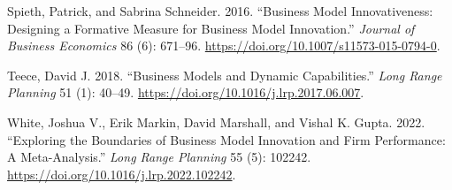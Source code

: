 \documentclass[
]{article}
\newlength{\cslhangindent}
\newenvironment{CSLReferences}[2] %
 {\begin{list}{}{%
  \setlength{\itemindent}{0pt}
  \setlength{\leftmargin}{0pt}
  \setlength{\parsep}{0pt}
  \ifodd #1
   \setlength{\leftmargin}{\cslhangindent}
   \setlength{\itemindent}{-1\cslhangindent}
  \fi
  \setlength{\itemsep}{#2\baselineskip}}}
 {\end{list}}
\begin{document}
\begin{CSLReferences}{1}{0}
Spieth, Patrick, and Sabrina Schneider. 2016. {``Business Model
Innovativeness: Designing a Formative Measure for Business Model
Innovation.''} \emph{Journal of Business Economics} 86 (6): 671--96.
\url{https://doi.org/10.1007/s11573-015-0794-0}.

Teece, David J. 2018. {``Business Models and Dynamic Capabilities.''}
\emph{Long Range Planning} 51 (1): 40--49.
\url{https://doi.org/10.1016/j.lrp.2017.06.007}.

White, Joshua V., Erik Markin, David Marshall, and Vishal K. Gupta.
2022. {``Exploring the Boundaries of Business Model Innovation and Firm
Performance: {A} Meta-Analysis.''} \emph{Long Range Planning} 55 (5):
102242. \url{https://doi.org/10.1016/j.lrp.2022.102242}.

\end{CSLReferences}
\end{document}
